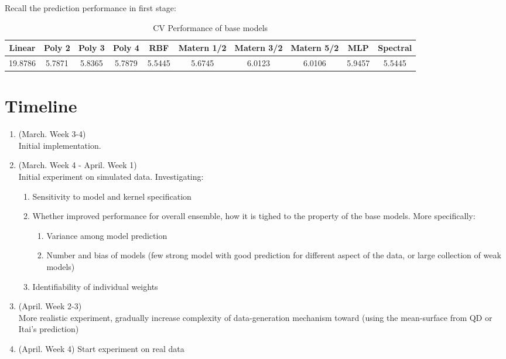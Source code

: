 \documentclass[11pt]{article}
\theoremstyle{definition}
\begin{document}
Recall the prediction performance in first stage:
\begin{table}[!htbp] 
\centering 
  \label{} 
\begin{tabular}{|c|c|c|c|c|c|c|c|c|c|} 
\hline \hline 
 Linear & Poly 2 & Poly 3 & Poly 4 & RBF & Matern 1/2 & Matern 3/2 & Matern 5/2 & MLP & Spectral
\\ \hline 
 19.8786 & 5.7871 & 5.8365 & 5.7879 & 5.5445 & 5.6745 & 6.0123 & 6.0106 & 5.9457 & 5.5445
\\
\hline\hline
\end{tabular} 
\caption{CV Performance of base models} 
\label{tb:res_joint}
\end{table}



\clearpage
\section{\textbf{Timeline}}
\begin{enumerate}
\item (March. Week 3-4) \\
Initial implementation. 
\item (March. Week 4 - April. Week 1) \\
Initial experiment on simulated data.
Investigating:
\begin{enumerate}
\item Sensitivity to model and kernel specification
\item Whether improved performance for overall ensemble, how it is tighed to the property of the base models. More specifically:
\begin{enumerate}
\item Variance among model prediction
\item Number and bias of models (few strong model with good prediction for different aspect of the data, or large collection of weak models)
\end{enumerate}
\item Identifiability of individual weights
\end{enumerate} 
\item (April. Week 2-3) \\
More realistic experiment, gradually increase complexity of data-generation mechanism toward (using the mean-surface from QD or Itai's prediction)
\item (April. Week 4) Start experiment on real data
\end{enumerate}
\end{document}
